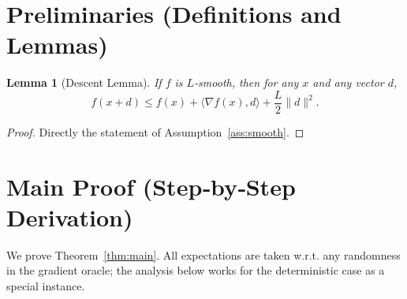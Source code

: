 \documentclass{article}
\newtheorem{lemma}{Lemma}
\begin{document}
\section*{Preliminaries (Definitions and Lemmas)}
\begin{lemma}[Descent Lemma]\label{lem:descent}
If $f$ is $L$‑smooth, then for any $x$ and any vector $d$,
\[
f(x+d)\le f(x)+\langle\nabla f(x),d\rangle+\frac{L}{2}\|d\|^2 .
\]
\end{lemma}
\begin{proof}
Directly the statement of Assumption~\ref{ass:smooth}. \qedhere
\end{proof}

\section*{Main Proof (Step‑by‑Step Derivation)}
We prove Theorem~\ref{thm:main}.  
All expectations are taken w.r.t. any randomness in the gradient oracle; the
analysis below works for the deterministic case as a special instance.
\end{document}

